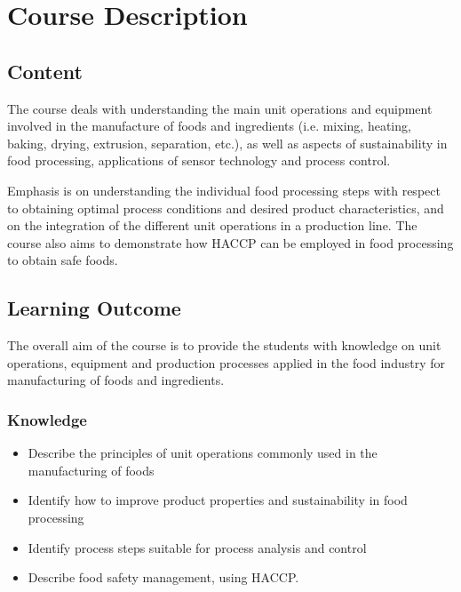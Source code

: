 \chapter{Course Description}
\section{Content}
The course deals with understanding the main unit operations and equipment involved in the manufacture of foods and ingredients (i.e. mixing, heating, baking, drying, extrusion, separation, etc.), as well as aspects of sustainability in food processing, applications of sensor technology and process control.

Emphasis is on understanding the individual food processing steps with respect to obtaining optimal process conditions and desired product characteristics, and on the integration of the different unit operations in a production line. The course also aims to demonstrate how HACCP can be employed in food processing to obtain safe foods.

\section{Learning Outcome}
The overall aim of the course is to provide the students with knowledge on unit operations, equipment and production processes applied in the food industry for manufacturing of foods and ingredients.

\subsection{Knowledge}
\begin{highlight}
    \begin{itemize}
        \item Describe the principles of unit operations commonly used in the manufacturing of foods
        \item Identify how to improve product properties and sustainability in food processing
        \item Identify process steps suitable for process analysis and control
        \item Describe food safety management, using HACCP.
    \end{itemize}
\end{highlight}

